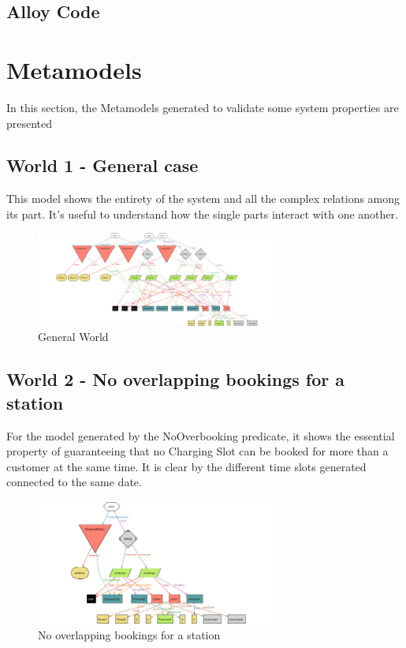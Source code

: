 \documentclass[12pt]{report}
\begin{document}
\subsection{Alloy Code}

\newpage
\section{Metamodels}
In this section, the Metamodels generated to validate some system properties are presented
\subsection{World 1 - General case}
This model shows the entirety of the system and all the complex relations among its part. It's useful to understand how the single parts interact with one another. 
\begin{figure}[h]
    \centering
    \includegraphics[width = 0.7\textwidth]{assets/alloy_1.png}
    \caption{General World}
\end{figure}

\subsection{World 2 - No overlapping bookings for a station}
For the model generated by the NoOverbooking predicate, it shows the essential property of guaranteeing that no Charging Slot can be booked for more than a customer at the same time. It is clear by the different time slots generated connected to the same date.
\begin{figure}[h]
    \centering
    \includegraphics[width = 0.7\textwidth]{assets/alloy_2.png}
    \caption{No overlapping bookings for a station}
\end{figure}
\newpage
\end{document}
